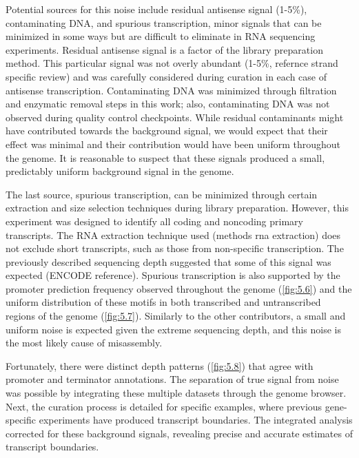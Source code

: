 Potential sources for this noise include residual antisense signal (1-5\%), contaminating DNA, and spurious transcription, minor signals that can be minimized in some ways but are difficult to eliminate in RNA sequencing experiments. Residual antisense signal is a factor of the library preparation method. This particular signal was not overly abundant (1-5\%, refernce strand specific review) and was carefully considered during curation in each case of antisense transcription. Contaminating DNA was minimized through filtration and enzymatic removal steps in this work; also, contaminating DNA was not observed during quality control checkpoints. While residual contaminants might have contributed towards the background signal, we would expect that their effect was minimal and their contribution would have been uniform throughout the genome. It is reasonable to suspect that these signals produced a small, predictably uniform background signal in the genome.

The last source, spurious transcription, can be minimized through certain extraction and size selection techniques during library preparation. However, this experiment was designed to identify all coding and noncoding primary transcripts. The RNA extraction technique used (methods rna extraction) does not exclude short transcripts, such as those from non-specific transcription. The previously described sequencing depth suggested that some of this signal was expected (ENCODE reference). Spurious transcription is also supported by the promoter prediction frequency observed throughout the genome (\ref{fig:5.6}) and the uniform distribution of these motifs in both transcribed and untranscribed regions of the genome (\ref{fig:5.7}). Similarly to the other contributors, a small and uniform noise is expected given the extreme sequencing depth, and this noise is the most likely cause of misassembly.


 Fortunately, there were distinct depth patterns (\ref{fig:5.8}) that agree with promoter and terminator annotations. The separation of true signal from noise was possible by integrating these multiple datasets through the genome browser. Next, the curation process is detailed for specific examples, where previous gene-specific experiments have produced transcript boundaries. The integrated analysis corrected for these background signals, revealing precise and accurate estimates of transcript boundaries. 




